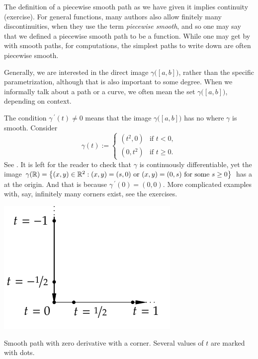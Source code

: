 The definition of a piecewise smooth path as we have given it implies
continuity (exercise).  For general functions, many authors also
allow finitely many discontinuities, when they use the term \emph{piecewise
smooth}, and so one may say that we defined a piecewise smooth path
to be a \emph{} function.
While one may get by with smooth paths, for computations, the simplest
paths to write down are often piecewise smooth.

Generally, we are interested in the direct image $\gamma\bigl([a,b]\bigr)$,
rather than the specific parametrization, although that is also
important to some degree.  When we informally talk about a path or a curve,
we often mean the set $\gamma\bigl([a,b]\bigr)$, depending
on context.


\begin{example}
The condition $\gamma^{\:\prime}(t) \not= 0$ means that the image
$\gamma\bigl([a,b]\bigr)$
has no  where $\gamma$ is smooth.
Consider 
\begin{equation*}
\gamma(t) :=
\begin{cases}
(t^2,0) & \text{if } t < 0,\\
(0,t^2) & \text{if } t \geq 0.
\end{cases}
\end{equation*}
See .
It is left for the reader to check that $\gamma$ is continuously
differentiable, yet the image $\gamma({\mathbb{R}}) = \bigl\{ (x,y) \in {\mathbb{R}}^2 : (x,y) =
(s,0) \text{ or } (x,y) = (0,s) \text{ for some } s \geq 0 \bigr\}$ has a
 at the origin.  And that is because $\gamma^{\:\prime}(0) = (0,0)$.
More complicated examples with, say, infinitely many corners exist,
see the exercises.
\begin{myfigureht}
\includegraphics{figures/cornersmoothpath}
\caption{Smooth path with zero derivative with a corner.  Several values of
$t$ are marked with dots.\label{fig:cornersmoothpath}}
\end{myfigureht}
\end{example}

